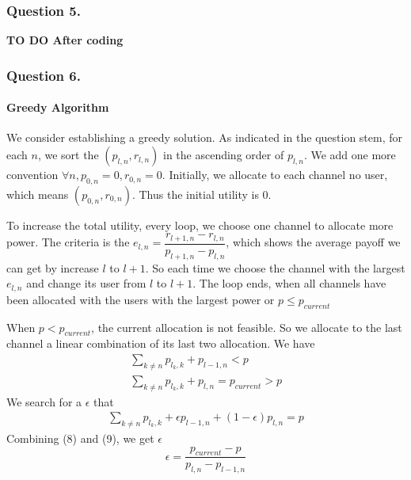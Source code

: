 \documentclass[11pt, oneside]{report}
\begin{document}
\subsubsection{Question 5.}
\textbf{TO DO After coding}

\subsubsection{Question 6.}
\paragraph{Greedy Algorithm} 
We consider establishing a greedy solution. As indicated in the question stem, for each $n$, we sort the $(p_{l,n}, r_{l,n})$ in the ascending order of $p_{l,n}$. We add one more convention $\forall n, p_{0,n} = 0, r_{0,n} = 0 $. Initially, we allocate to each channel no user, which means $(p_{0,n}, r_{0,n})$. Thus the initial utility is 0. 

To increase the total utility, every loop, we choose one channel to allocate more power. The criteria is the $e_{l,n} = \dfrac{r_{l+1,n} - r_{l,n}}{p_{l+1,n} - p_{l,n}}$, which shows the average payoff we can get by increase $l$ to $l+1$. So each time we choose the channel with the largest $e_{l,n}$ and change its user from $l$ to $l+1$. The loop ends, when all channels have been allocated with the users with the largest power or $p \leq p_{current}$

When $p < p_{current}$, the current allocation is not feasible. So we allocate to the last channel a linear combination of its last two allocation. We have 
\begin{align}
\sum_{k \ne n} p_{l_k,k} + p_{l-1,n} < p \\
\sum_{k \ne n} p_{l_k,k} + p_{l,n} = p_{current} > p
\end{align}
We search for a $\epsilon$ that 
\begin{align}
\sum_{k \ne n} p_{l_k,k} + \epsilon p_{l-1,n} + (1-\epsilon) p_{l,n} = p
\end{align}
Combining (8) and (9), we get $\epsilon$
$$ \epsilon = \dfrac{p_{current} - p}{p_{l,n} - p_{l-1,n}}$$
\end{document}
